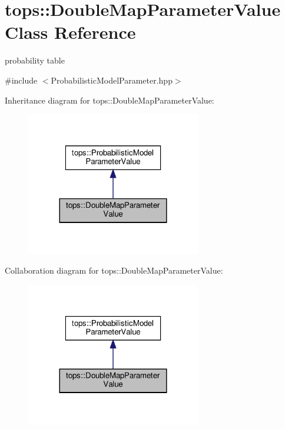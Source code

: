 \hypertarget{classtops_1_1DoubleMapParameterValue}{}\section{tops\+:\+:Double\+Map\+Parameter\+Value Class Reference}
\label{classtops_1_1DoubleMapParameterValue}


probability table  




{\ttfamily \#include $<$Probabilistic\+Model\+Parameter.\+hpp$>$}



Inheritance diagram for tops\+:\+:Double\+Map\+Parameter\+Value\+:
\nopagebreak
\begin{figure}[H]
\begin{center}
\leavevmode
\includegraphics[width=216pt]{classtops_1_1DoubleMapParameterValue__inherit__graph}
\end{center}
\end{figure}


Collaboration diagram for tops\+:\+:Double\+Map\+Parameter\+Value\+:
\nopagebreak
\begin{figure}[H]
\begin{center}
\leavevmode
\includegraphics[width=216pt]{classtops_1_1DoubleMapParameterValue__coll__graph}
\end{center}
\end{figure}
